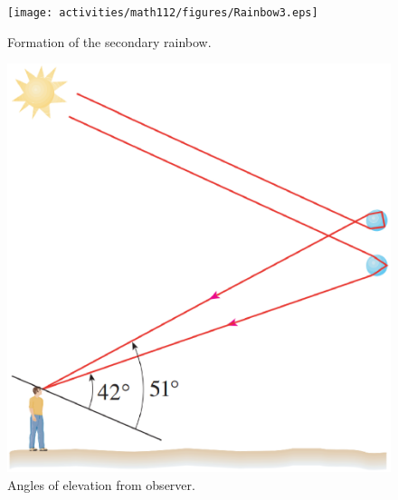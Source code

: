\begin{figure}[h]
	\label{fig:rainbow3}
	\centering
	\parbox{0.5\linewidth}{
		\texttt{[image: activities/math112/figures/Rainbow3.eps]}
		\caption{Formation of the secondary rainbow.}
	}
	\hspace{0.05\linewidth}
	\parbox{0.4\linewidth}{
		\includegraphics[scale=0.25]{activities/math112/figures/Rainbow4.eps}
		\caption{Angles of elevation from observer.}
	}
\end{figure}

